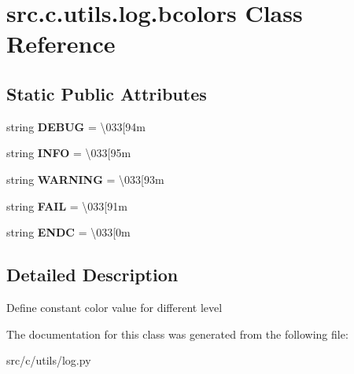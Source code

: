 \hypertarget{classsrc_1_1c_1_1utils_1_1log_1_1bcolors}{}\section{src.\+c.\+utils.\+log.\+bcolors Class Reference}
\label{classsrc_1_1c_1_1utils_1_1log_1_1bcolors}
\subsection*{Static Public Attributes}
\begin{DoxyCompactItemize}
\item 
\hypertarget{classsrc_1_1c_1_1utils_1_1log_1_1bcolors_a1756b2cfb1260751b387e70f2135c29f}{}string {\bfseries D\+E\+B\+U\+G} = \textquotesingle{}\textbackslash{}033\mbox{[}94m \textquotesingle{}\label{classsrc_1_1c_1_1utils_1_1log_1_1bcolors_a1756b2cfb1260751b387e70f2135c29f}

\item 
\hypertarget{classsrc_1_1c_1_1utils_1_1log_1_1bcolors_a1b6e06dd1dc5b17386f4e6240be50234}{}string {\bfseries I\+N\+F\+O} = \textquotesingle{} \textbackslash{}033\mbox{[}95m \textquotesingle{}\label{classsrc_1_1c_1_1utils_1_1log_1_1bcolors_a1b6e06dd1dc5b17386f4e6240be50234}

\item 
\hypertarget{classsrc_1_1c_1_1utils_1_1log_1_1bcolors_ab0937c0bdf3f5df52938fb0e5eed81ff}{}string {\bfseries W\+A\+R\+N\+I\+N\+G} = \textquotesingle{} \textbackslash{}033\mbox{[}93m \textquotesingle{}\label{classsrc_1_1c_1_1utils_1_1log_1_1bcolors_ab0937c0bdf3f5df52938fb0e5eed81ff}

\item 
\hypertarget{classsrc_1_1c_1_1utils_1_1log_1_1bcolors_a0d23181f8f0b8808cdcbe662a39badc0}{}string {\bfseries F\+A\+I\+L} = \textquotesingle{} \textbackslash{}033\mbox{[}91m \textquotesingle{}\label{classsrc_1_1c_1_1utils_1_1log_1_1bcolors_a0d23181f8f0b8808cdcbe662a39badc0}

\item 
\hypertarget{classsrc_1_1c_1_1utils_1_1log_1_1bcolors_a04bf4d85341c7c2fc1e8528aa753e907}{}string {\bfseries E\+N\+D\+C} = \textquotesingle{} \textbackslash{}033\mbox{[}0m \textquotesingle{}\label{classsrc_1_1c_1_1utils_1_1log_1_1bcolors_a04bf4d85341c7c2fc1e8528aa753e907}

\end{DoxyCompactItemize}


\subsection{Detailed Description}
\begin{DoxyVerb}Define constant color value for different level
\end{DoxyVerb}
 

The documentation for this class was generated from the following file\+:\begin{DoxyCompactItemize}
\item 
src/c/utils/log.\+py\end{DoxyCompactItemize}
